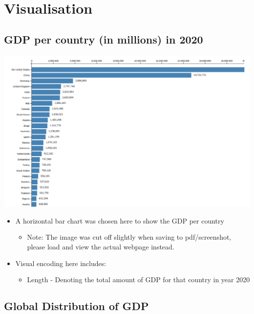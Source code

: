 \documentclass[a4paper, 11pt]{article}
\begin{document}
\section{Visualisation}
\label{sec:org3172183}
\subsection{GDP per country (in millions) in 2020}
\label{sec:org4fe5733}

\begin{center}
\includegraphics[width=.9\linewidth]{./charts/gdp_per_country.png}
\end{center}

\begin{itemize}
\item A horizontal bar chart was chosen here to show the GDP per country
\begin{itemize}
\item Note: The image was cut off slightly when saving to pdf/screenshot, please load and view the actual webpage instead.
\end{itemize}
\item Visual encoding here includes:
\begin{itemize}
\item Length - Denoting the total amount of GDP for that country in year 2020
\end{itemize}
\end{itemize}
\subsection{Global Distribution of GDP}
\label{sec:org6157783}
\end{document}
